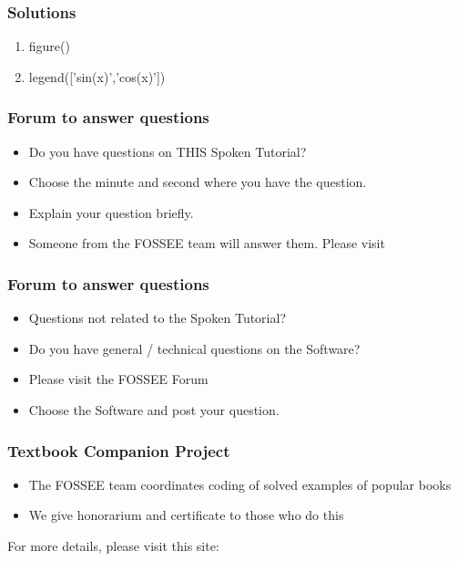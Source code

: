 \documentclass[17pt]{beamer}
\begin{document}
\begin{frame}
\frametitle{Solutions}
\label{sec-9}
\begin{enumerate}
\item figure()
\item legend(['sin(x)','cos(x)'])
\end{enumerate}
\end{frame}

\begin{frame}
\frametitle{Forum to answer questions}
\begin{itemize}
\item Do you have questions on THIS Spoken Tutorial?
\item Choose the minute and second where you have the question.
\item Explain your question briefly.
\item Someone from the FOSSEE team will answer them. Please visit 
\end{itemize}
\begin{center}
{\color{blue}{http://forums.spoken-tutorial.org/}}
 \end{center} 
\end{frame}
\begin{frame}
\frametitle{ Forum to answer questions}
\begin{itemize}
\item Questions not related to the Spoken Tutorial?
\item Do you have general / technical questions on the Software?
\item Please visit the FOSSEE Forum
\begin{center}
{\color{blue}{http://forums.fossee.in/}}
 \end{center}
\item Choose the Software and post your question.
\end{itemize}
\end{frame}
\begin{frame}
\frametitle{Textbook Companion Project}
\begin{itemize}
\item The FOSSEE team coordinates coding of solved examples of popular
  books 
\item We give honorarium and certificate to those who do this
\end{itemize}
For more details, please visit this site:
\begin{center}
{\color{blue}{http://tbc-python.fossee.in/}}
\end{center}
\end{frame}
\end{document}
